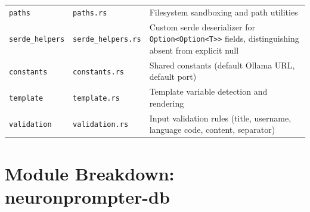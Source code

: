 \documentclass[a4paper, 11pt, oneside]{report}
\begin{document}
\begin{table}[H]
\begin{tabularx}{\textwidth}{l l X}
    \texttt{paths}         & \texttt{paths.rs}     & Filesystem sandboxing and path utilities \\
    \texttt{serde\_helpers} & \texttt{serde\_helpers.rs} & Custom serde deserializer for
                                                      \texttt{Option<Option<T>{}>} fields,
                                                      distinguishing absent from explicit null \\
    \texttt{constants}     & \texttt{constants.rs} & Shared constants (default Ollama URL, default port) \\
    \texttt{template}      & \texttt{template.rs}  & Template variable detection and rendering \\
    \texttt{validation}    & \texttt{validation.rs}& Input validation rules (title, username,
                                                      language code, content, separator) \\
    \bottomrule
  \end{tabularx}
\end{table}

\section{Module Breakdown: neuronprompter-db}
\label{sec:mod-db}
\end{document}
